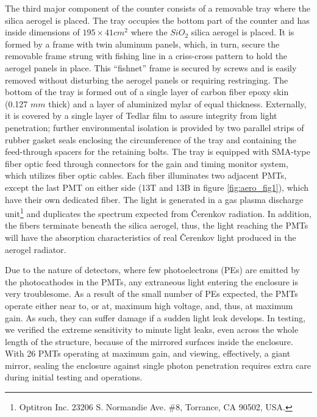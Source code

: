 The third major component of the counter consists of a removable tray where the
silica aerogel is placed. The tray occupies the bottom part of the counter and
has inside dimensions of $195\times 41 cm^2$ where the $SiO_2$ silica aerogel
is placed. It is formed by a frame with twin aluminum panels, which, in turn,
secure the removable frame strung with fishing line in a criss-cross pattern
to hold the aerogel panels in place.  This ``fishnet'' frame is secured by
screws and is easily removed without disturbing the aerogel panels or requiring
restringing.  The bottom of the tray is formed out of a single layer of carbon
fiber epoxy skin (0.127 $mm$ thick) and a layer of aluminized mylar of equal
thickness.  Externally, it is covered by a single layer of Tedlar film to
assure integrity from light penetration; further environmental isolation is
provided by two parallel strips of rubber gasket seals enclosing the
circumference of the tray and containing the feed-through spacers for the
retaining bolts.   The tray is equipped with SMA-type fiber optic feed through
connectors for the gain and timing monitor system, which utilizes fiber
optic cables.  Each fiber illuminates two adjacent PMTs, except the last PMT
on either side (13T and 13B in figure \ref{fig:aero_fig1}), which have their own dedicated fiber. 
The light is generated in a gas plasma discharge 
unit\footnote{Optitron Inc. 23206 S. Normandie Ave. \#8, Torrance, CA 90502, USA.} 
and
duplicates the spectrum expected from \v{C}erenkov radiation.  In addition, the
fibers terminate beneath the silica aerogel, thus, the light reaching the PMTs
will have the absorption characteristics of real \v{C}erenkov light produced 
in the aerogel radiator. 

Due to the nature of \Cerenkov detectors, where few photoelectrons (PEs) are
emitted by the photocathodes in the PMTs, any extraneous light entering the
enclosure is very troublesome.  As a result of the small number of PEs
expected, the PMTs operate either near to, or at, maximum high voltage, and,
thus, at maximum gain.  As such, they can suffer damage if a sudden light leak
develops.  In testing, we verified the extreme sensitivity to minute light
leaks, even across the whole length of the structure, because of the mirrored
surfaces inside the enclosure.  With 26 PMTs operating at maximum gain, and
viewing, effectively, a giant mirror, sealing the enclosure against single
photon penetration requires extra care during initial testing and operations.

